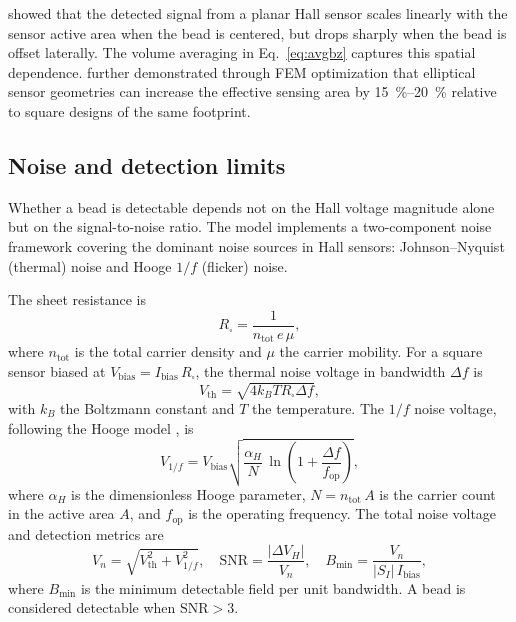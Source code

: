 \documentclass[pdflatex,sn-basic]{sn-jnl}
\theoremstyle{thmstyleone}
\theoremstyle{thmstyletwo}
\theoremstyle{thmstylethree}
\begin{document}
\citet{tu2009} showed that the detected signal from a planar Hall sensor scales linearly with the sensor active area when the bead is centered, but drops sharply when the bead is offset laterally. The volume averaging in Eq.~\eqref{eq:avgbz} captures this spatial dependence. \citet{uddin2022} further demonstrated through FEM optimization that elliptical sensor geometries can increase the effective sensing area by \SIrange{15}{20}{\percent} relative to square designs of the same footprint.

\subsection{Noise and detection limits}\label{sec:noise}

Whether a bead is detectable depends not on the Hall voltage magnitude alone but on the signal-to-noise ratio. The model implements a two-component noise framework covering the dominant noise sources in Hall sensors: Johnson--Nyquist (thermal) noise and Hooge $1/f$ (flicker) noise.

The sheet resistance is
\begin{equation}
R_\square = \frac{1}{n_\text{tot}\, e\, \mu},
\label{eq:rsq}
\end{equation}
where $n_\text{tot}$ is the total carrier density and $\mu$ the carrier mobility. For a square sensor biased at $V_\text{bias} = I_\text{bias}\, R_\square$, the thermal noise voltage in bandwidth $\Delta f$ is
\begin{equation}
V_\text{th} = \sqrt{4 k_B T R_\square \Delta f},
\label{eq:thermal}
\end{equation}
with $k_B$ the Boltzmann constant and $T$ the temperature. The $1/f$ noise voltage, following the Hooge model \citep{xu2013,huang2014}, is
\begin{equation}
V_{1/f} = V_\text{bias}\sqrt{\frac{\alpha_H}{N}\,\ln\!\left(1 + \frac{\Delta f}{f_\text{op}}\right)},
\label{eq:flicker}
\end{equation}
where $\alpha_H$ is the dimensionless Hooge parameter, $N = n_\text{tot}\, A$ is the carrier count in the active area $A$, and $f_\text{op}$ is the operating frequency. The total noise voltage and detection metrics are
\begin{equation}
V_n = \sqrt{V_\text{th}^2 + V_{1/f}^2}, \quad \text{SNR} = \frac{|\Delta V_H|}{V_n}, \quad B_\text{min} = \frac{V_n}{|S_I|\, I_\text{bias}},
\label{eq:snr}
\end{equation}
where $B_\text{min}$ is the minimum detectable field per unit bandwidth. A bead is considered detectable when $\text{SNR} > 3$.
\end{document}
